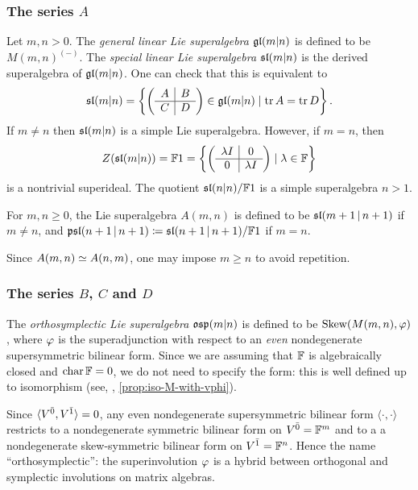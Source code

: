 \subsubsection{The series $A$} 

Let $m,n > 0$. 
The \emph{general linear Lie superalgebra} $\mathfrak{gl}(m|n)$ is defined to be $M(m,n)^{(-)}$. 
The \emph{special linear Lie superalgebra} $\mathfrak{sl} (m|n)$ is the derived superalgebra of $\mathfrak{gl}(m|n)$. 
One can check that this is equivalent to
%
\[
    \mathfrak{sl}(m|n) = \left\{
    \left(\begin{array}{c|c}
        A & B\\
        \hline
        C & D
    \end{array}\right)
	\in \mathfrak{gl}(m|n)
	\mid \operatorname{tr} A = \operatorname{tr} D
	\right\}.
\]
%
If $m\neq n$ then $\mathfrak{sl}(m|n)$ is a simple Lie superalgebra. 
However, if $m=n$, then
\[
    Z(\mathfrak{sl}(m|n)) = \mathbb{F} 1 = \left\{
    \left(\begin{array}{c|c}
        \lambda I & 0\\
        \hline
        0 & \lambda I
    \end{array}\right)
	\mid \lambda \in \mathbb{F}
	\right\}
\]
is a nontrivial superideal. 
The quotient $\mathfrak{sl}(n|n)/ \mathbb{F} 1$ is a simple superalgebra \IFF $n > 1$. 

For $m,n\geq 0$, the Lie superalgebra $A(m,n)$ is defined to be $\mathfrak{sl}(m+1 \,|\, n+1)$ if $m\neq n$, and $\mathfrak{psl}(n+1 \,|\, n+1) \coloneqq \mathfrak{sl}(n+1 \,|\, n+1)/ \mathbb{F} 1$ if $m=n$. 

Since $A(m,n)\simeq A(n,m)$, one may impose $m\geq n$ to avoid repetition. 

\subsubsection{The series $B$, $C$ and $D$}

The \emph{orthosymplectic Lie superalgebra} $\mathfrak{osp}(m|n)$ is defined to be $\operatorname{Skew}(M(m,n),\varphi)$, where $\varphi$ is the superadjunction with respect to an \emph{even} nondegenerate supersymmetric bilinear form. 
Since we are assuming that $\mathbb{F}$ is algebraically closed and $\operatorname{char} \mathbb{F} = 0$, we do not need to specify the form: this is well defined up to isomorphism (see, \eg, \cref{prop:iso-M-with-vphi}). 

Since $\langle V^{\bar0}, V^{\bar1} \rangle = 0$, any even nondegenerate supersymmetric bilinear form $\langle \cdot, \cdot \rangle$ restricts to a nondegenerate symmetric bilinear form on $V^{\bar0} = \mathbb{F}^m$ and to a a nondegenerate skew-symmetric bilinear form on $V^{\bar1} = \mathbb{F}^n$. 
Hence the name ``orthosymplectic'': the superinvolution $\varphi$ is a hybrid between orthogonal and symplectic involutions on matrix algebras. 

